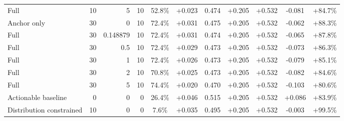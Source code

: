 \begin{table}[htbp]
\begin{tabular}{lrrrccccccc}
Full & 10 & 5 & 10 & 52.8\% & +0.023 & 0.474 & +0.205 & +0.532 & -0.081 & +84.7\% \\
Anchor only & 30 & 0 & 10 & 72.4\% & +0.031 & 0.475 & +0.205 & +0.532 & -0.062 & +88.3\% \\
Full & 30 & 0.148879 & 10 & 72.4\% & +0.031 & 0.474 & +0.205 & +0.532 & -0.065 & +87.8\% \\
Full & 30 & 0.5 & 10 & 72.4\% & +0.029 & 0.473 & +0.205 & +0.532 & -0.073 & +86.3\% \\
Full & 30 & 1 & 10 & 72.4\% & +0.026 & 0.473 & +0.205 & +0.532 & -0.079 & +85.1\% \\
Full & 30 & 2 & 10 & 70.8\% & +0.025 & 0.473 & +0.205 & +0.532 & -0.082 & +84.6\% \\
Full & 30 & 5 & 10 & 74.4\% & +0.020 & 0.470 & +0.205 & +0.532 & -0.103 & +80.6\% \\
Actionable baseline & 0 & 0 & 0 & 26.4\% & +0.046 & 0.515 & +0.205 & +0.532 & +0.086 & +83.9\% \\
Distribution constrained & 10 & 0 & 0 & 7.6\% & +0.035 & 0.495 & +0.205 & +0.532 & -0.003 & +99.5\% \\
\bottomrule
\end{tabular}
\end{table}
